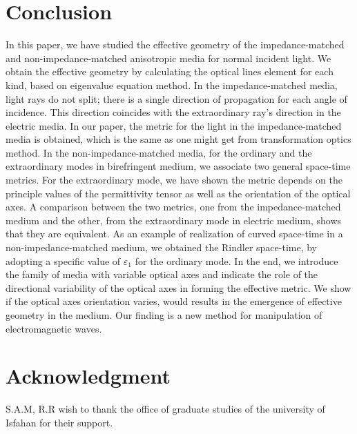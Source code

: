 \documentclass[9pt,twocolumn,twoside]{osajnl}
\begin{document}
 
\section{Conclusion}\label{conclusion}

In this paper, we have studied the effective geometry of the impedance-matched and non-impedance-matched anisotropic media for normal incident light.  We obtain the effective geometry by calculating the optical lines element for each kind, based on eigenvalue equation method. In the impedance-matched media, light rays do not split; there is a single direction of propagation for each angle of incidence. This direction coincides with the extraordinary ray's direction in the electric media. In our paper, the metric for the light in the impedance-matched media is obtained, which is the same as one might get from transformation optics method. 
In the non-impedance-matched media, for the ordinary and the extraordinary modes in birefringent medium, we associate two general space-time metrics. For the extraordinary mode, we have shown the metric depends on the principle values of the permittivity tensor as well as the orientation of the optical axes. A comparison between the two metrics, one from the impedance-matched medium and the other, from the extraordinary mode in electric medium, shows that they are equivalent. As an example of realization of curved space-time in a non-impedance-matched medium, we obtained the Rindler space-time, by adopting a specific value of $\varepsilon_{1}$ for the ordinary mode.  
In the end, we introduce the family of media with variable optical axes and indicate the role of the directional variability of the optical axes in forming the effective metric. We show if the optical axes orientation varies, would results in the emergence of effective geometry in the medium. Our finding is a new method for manipulation of electromagnetic waves.  
 

\section*{Acknowledgment}
S.A.M, R.R wish to thank the office of graduate studies of the university of Isfahan for their support.


\end{document}
